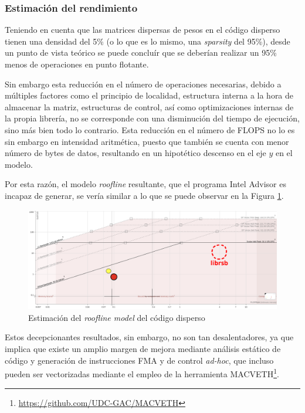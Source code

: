\subsubsection{Estimación del rendimiento}
Teniendo en cuenta que las matrices dispersas de pesos en el código disperso tienen una densidad del 5\% (o lo que es lo mismo, una \textit{sparsity} del 95\%), desde un punto de vista teórico se puede concluír que se deberían realizar un 95\% menos de operaciones en punto flotante.

Sin embargo esta reducción en el número de operaciones necesarias, debido a múltiples factores como el principio de localidad, estructura interna a la hora de almacenar la matriz, estructuras de control, así como optimizaciones internas de la propia librería, no se corresponde con una disminución del tiempo de ejecución, sino más bien todo lo contrario. Esta reducción en el número de FLOPS no lo es sin embargo en intensidad aritmética, puesto que también se cuenta con menor número de bytes de datos, resultando en un hipotético descenso en el eje $y$ en el modelo.

Por esta razón, el modelo \textit{roofline} resultante, que el programa Intel Advisor es incapaz de generar, se vería similar a lo que se puede observar en la Figura \ref{fig:roofline_sparse_estimado}.

\begin{figure}[h!]
    \centering
    \includegraphics[width=\textwidth]{img/roofline_sparse_estimado.png}
    \caption{Estimación del \textit{roofline model} del código disperso}
    \label{fig:roofline_sparse_estimado}
\end{figure}

Estos decepcionantes resultados, sin embargo, no son tan desalentadores, ya que implica que existe un amplio margen de mejora mediante análisis estático de código y generación de instrucciones FMA y de control \textit{ad-hoc}, que incluso pueden ser vectorizadas mediante el empleo de la herramienta MACVETH\footnote{\url{https://github.com/UDC-GAC/MACVETH}}.